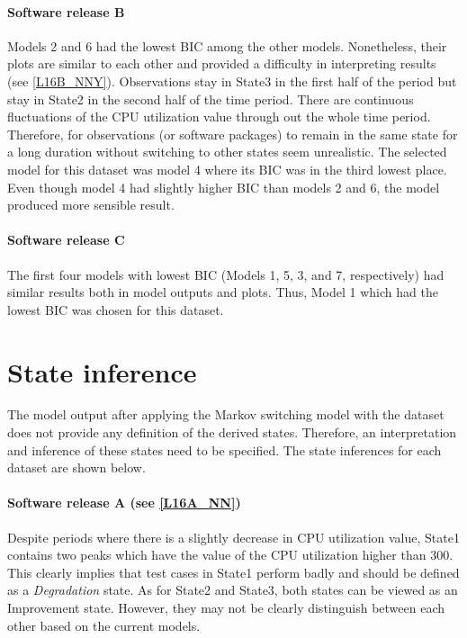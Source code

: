\paragraph*{Software release B}

Models 2 and 6 had the lowest BIC among the other models. Nonetheless,
their plots are similar to each other and provided a difficulty in
interpreting results (see \ref{L16B_NNY}). Observations stay in State3
in the first half of the period but stay in State2 in the second half
of the time period. There are continuous fluctuations of the CPU utilization
value through out the whole time period. Therefore, for observations
(or software packages) to remain in the same state for a long duration
without switching to other states seem unrealistic. The selected model
for this dataset was model 4 where its BIC was in the third lowest
place. Even though model 4 had slightly higher BIC than models 2 and
6, the model produced more sensible result.

\paragraph*{Software release C}

The first four models with lowest BIC (Models 1, 5, 3, and 7, respectively)
had similar results both in model outputs and plots. Thus, Model 1
which had the lowest BIC was chosen for this dataset.

\section{State inference}

The model output after applying the Markov switching model with the
dataset does not provide any definition of the derived states. Therefore,
an interpretation and inference of these states need to be specified.
The state inferences for each dataset are shown below. 

\paragraph{Software release A (see \ref{L16A_NN})}

Despite periods where there is a slightly decrease in CPU utilization
value, State1 contains two peaks which have the value of the CPU utilization
higher than 300. This clearly implies that test cases in State1 perform
badly and should be defined as a \emph{Degradation} state. As for
State2 and State3, both states can be viewed as an Improvement state.
However, they may not be clearly distinguish between each other based
on the current models. 


